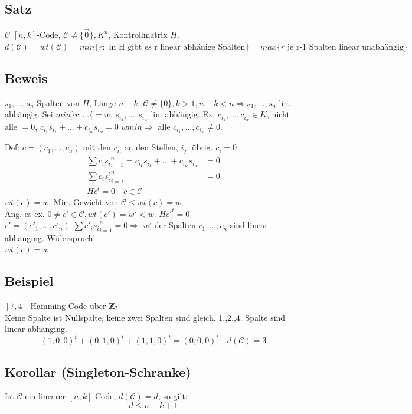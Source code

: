 %
%

\subsection{Satz}
$\mathcal{C}$ $[n,k]$-Code, $\mathcal{C} \neq \lbrace \vec{0} \rbrace, K^n$, Kontrollmatrix $H$.
$d(\mathcal{C})=wt(\mathcal{C})=min\lbrace r : \text{ in H gibt es r linear abh\"anige Spalten} \rbrace = max \lbrace r \text{ je r-1 Spalten linear unabh\"angig} \rbrace$
\subsection{Beweis}
$s_1,\ldots,s_n$ Spalten von $H$, L\"ange $n-k$. $\mathcal{C} \neq \lbrace 0 \rbrace, k> 1, n-k<n \Rightarrow s_1,\ldots,s_n$ lin. abh\"angig.
Sei $min \rbrace r: \ldots \lbrace = w$. $s_{i_1},\ldots, s_{i_w}$ lin. abh\"angig.
Ex. $c_{i_1},\ldots,c_{i_w} \in K$, nicht alle $=0$, $c_{i_1} s_{i_1}+\ldots+ c_{i_w} s_{i_w}=0$
$w min \Rightarrow$ alle $c_{i_1},\ldots, c_{i_w} \neq 0$.

Def: $c=(c_1, \ldots,  c_n)$ mit den $c_{i_j}$ an den Stellen, $i_j$, \"ubrig. $c_i=0$
\begin{align*}
	\sum{c_i s_i}^n_{i=1} = c_{i_1} s_{i_1} + \ldots + c_{i_w} s_{i_w} &=0\\
	\sum{c_i s_i^t}^n_{i=1}&=0 \\
	Hc^t=0 \quad c \in \mathcal{C}
\end{align*}
$wt(c)=w$, Min. Gewicht von $\mathcal{C} \leq wt(c)=w$ \\
Ang. es ex. $0 \neq c' \in \mathcal{C}, wt(c')=w' < w$. $Hc'^t=0$\\
$c'=(c'_1, \ldots,  c'_n)$ $\sum{c'_i s_i}^n_{i=1}=0 \Rightarrow$ $w'$ der Spalten $c_1,\ldots,c_n$ sind linear abh\"anging. Widerspruch! \\
$wt(c)=w$

%
%

\subsection{Beispiel}
$[7,4]$-Hamming-Code \"uber $\Z_2$\\
%
%
Keine Spalte ist Nullspalte, keine zwei Spalten sind  gleich. 1.,2.,4. Spalte sind linear abh\"anging.
\[
	(1,0,0)^t + (0,1,0)^t + (1,1,0)^t = (0,0,0)^t \quad d(\mathcal{C})=3
\]
\subsection{Korollar (Singleton-Schranke)}
Ist $\mathcal{C}$ ein linearer $[n,k]$-Code, $d(\mathcal{C})=d$, so gilt:
\[
	d \leq n-k + 1
\]
